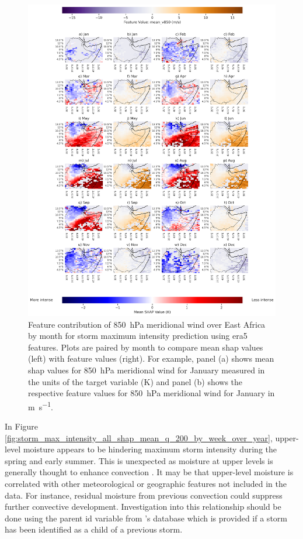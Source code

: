 \begin{figure}[ht]
    \centering
    \includegraphics[width=\textwidth]{../figures/generated/experiments/storm_max_intensity/geographic_corr/storm_max_intensity_era5_shap_mean_v850_map_by_month.png}
    \caption{Feature contribution of \SI{850}{\hecto\pascal} meridional wind over East Africa by month for storm maximum intensity prediction using \acrshort{era5} features. Plots are paired by month to compare mean \acrshort{shap} values (left) with feature values (right). For example, panel (a) shows mean \acrshort{shap} values for \SI{850}{\hecto\pascal} meridional wind for January measured in the units of the target variable (\unit{\kelvin}) and panel (b) shows the respective feature values for \SI{850}{\hecto\pascal} meridional wind for January in \unit{\meter\per\second}.}
    \label{fig:storm_max_intensity_era5_shap_mean_v850_map_by_month}
\end{figure}

In Figure \ref{fig:storm_max_intensity_all_shap_mean_q_200_by_week_over_year}, upper-level moisture appears to be hindering maximum storm intensity during the spring and early summer. This is unexpected as moisture at upper levels is generally thought to enhance convection \citep{Houze2004,Klein2021}. It may be that upper-level moisture is correlated with other meteorological or geographic features not included in the data. For instance, residual moisture from previous convection could suppress further convective development. Investigation into this relationship should be done using the parent id variable from \cite{Hill2023}'s database which is provided if a storm has been identified as a child of a previous storm.

